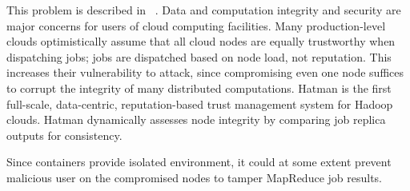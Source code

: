 This problem is described in ~\cite{khan2012hatman}.  Data and computation integrity and security are major concerns for users of cloud computing facilities. Many production-level clouds optimistically assume that all cloud nodes are equally trustworthy when dispatching jobs; jobs are dispatched based on node load, not reputation. This increases their vulnerability to attack, since compromising even one node suffices to corrupt the integrity of many distributed computations. Hatman is the first full-scale, data-centric, reputation-based trust management system for Hadoop clouds. Hatman dynamically assesses node integrity by comparing job replica outputs for consistency.

Since containers provide isolated environment, it could at some extent prevent malicious user on the compromised nodes to tamper MapReduce job results. 
